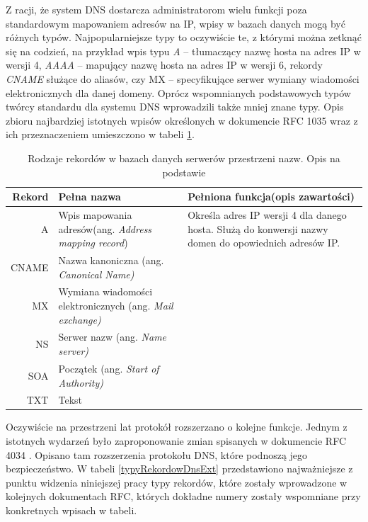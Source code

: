 Z racji, że system DNS dostarcza administratorom wielu funkcji poza standardowym mapowaniem adresów na IP, wpisy w bazach danych mogą być różnych typów. Najpopularniejsze typy to oczywiście te, z którymi można zetknąć się na codzień, na przykład wpis typu \textit{A} -- tłumaczący nazwę hosta na adres IP w wersji 4, \textit{AAAA} -- mapujący nazwę hosta na adres IP w wersji 6, rekordy \textit{CNAME} służące do aliasów, czy MX -- specyfikujące serwer wymiany wiadomości elektronicznych dla danej domeny. Oprócz wspomnianych podstawowych typów twórcy standardu dla systemu DNS wprowadzili także mniej znane typy. Opis zbioru najbardziej istotnych wpisów określonych w dokumencie RFC 1035 \cite{RFC1035} wraz z ich przeznaczeniem umieszczono w tabeli \ref{typyRekordowDns}.

\begin{table}[]
	\centering
	\caption{Rodzaje rekordów w bazach danych serwerów przestrzeni nazw. Opis na podstawie \cite{}}
	\label{typyRekordowDns}
	\begin{tabular}{|r|p{3cm}|p{8cm}|}
		\hline
			\textbf{Rekord} & 
			\textbf{Pełna nazwa} & 
			\textbf{Pełniona funkcja(opis zawartości)} \\
		\hline\hline
			A & 
			Wpis mapowania adresów(ang. \textit{Address mapping record}) & 
			Określa adres IP wersji 4 dla danego hosta. Służą do konwersji nazwy domen do opowiednich adresów IP.\\
		\hline
			CNAME & 
			Nazwa kanoniczna (ang. \textit{Canonical Name)} & 
			\\
		\hline
			MX & 
			Wymiana wiadomości elektronicznych (ang. \textit{Mail exchange)} & 
			\\
		\hline
			NS & 
			Serwer nazw (ang. \textit{Name server)} & 
			\\		
		\hline
			SOA & 
			Początek (ang. \textit{Start of Authority)} & 
			\\
		\hline
			TXT & 
			Tekst & 
		\\
		\hline
		
	\end{tabular}
\end{table}

Oczywiście na przestrzeni lat protokół rozszerzano o kolejne funkcje. Jednym z istotnych wydarzeń było zaproponowanie zmian spisanych w dokumencie RFC 4034 \cite{}. Opisano tam rozszerzenia protokołu DNS, które podnoszą jego bezpieczeństwo. W tabeli \ref{typyRekordowDnsExt} przedstawiono najważniejsze z punktu widzenia niniejszej pracy typy rekordów, które zostały wprowadzone w kolejnych dokumentach RFC, których dokładne numery zostały wspomniane przy konkretnych wpisach w tabeli. 

